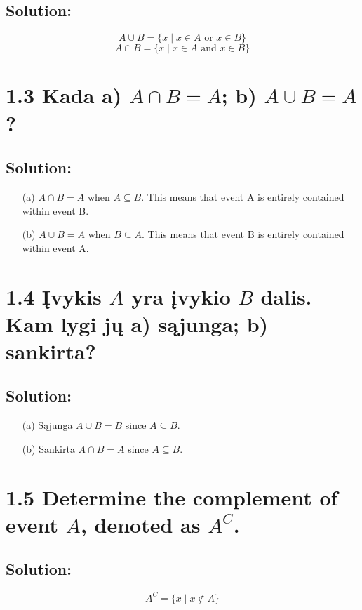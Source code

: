 \documentclass{article}
\begin{document}
\subsection*{Solution:}
\[
A \cup B = \{x \mid x \in A \text{ or } x \in B\}
\]
\[
A \cap B = \{x \mid x \in A \text{ and } x \in B\}
\]

\section*{1.3 Kada a) \(A \cap B = A\); b) \(A \cup B = A\)?}

\subsection*{Solution:}
\begin{itemize}
    \item[(a)] \(A \cap B = A\) when \(A \subseteq B\). This means that event A is entirely contained within event B.
    \item[(b)] \(A \cup B = A\) when \(B \subseteq A\). This means that event B is entirely contained within event A.
\end{itemize}

\section*{1.4 Įvykis \(A\) yra įvykio \(B\) dalis. Kam lygi jų a) sąjunga; b) sankirta?}

\subsection*{Solution:}
\begin{itemize}
    \item[(a)] Sąjunga \(A \cup B = B\) since \(A \subseteq B\).
    \item[(b)] Sankirta \(A \cap B = A\) since \(A \subseteq B\).
\end{itemize}

\section*{1.5 Determine the complement of event \(A\), denoted as \(A^C\).}

\subsection*{Solution:}
\[
A^C = \{x \mid x \notin A\}
\]
\end{document}
